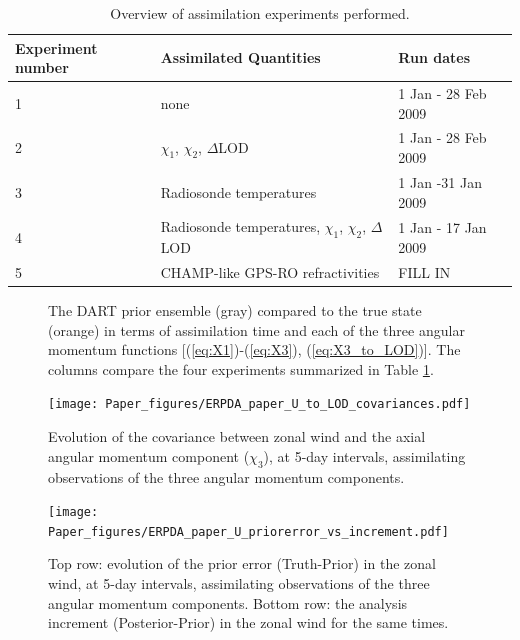 
\begin{table}
\caption{Overview of assimilation experiments performed.}
\centering
\begin{tabular}{p{2cm}p{5cm}p{4cm}}
Experiment number &  Assimilated Quantities  & Run dates \\
\hline
1 &  none	& 1 Jan - 28 Feb 2009 \\
2 &  $\chi_1$, $\chi_2$, $\Delta$LOD		& 1 Jan - 28 Feb 2009 \\
3 &  Radiosonde temperatures	& 1 Jan -31 Jan 2009	\\
4 &  Radiosonde temperatures, $\chi_1$, $\chi_2$, $\Delta$LOD	& 1 Jan - 17 Jan 2009\\
5 & \textcolor{unsure}{CHAMP-like GPS-RO refractivities} & \textcolor{alert}{FILL IN}	\\
\hline
\end{tabular}
\label{tab:expts}
\end{table}

 \begin{figure}
 \caption{  }
 \label{fig:RS}
\end{figure}

 \begin{figure}
 \caption{ The DART prior ensemble (gray) compared to the true state (orange) in terms of assimilation time and each of the three angular momentum functions [(\ref{eq:X1})-(\ref{eq:X3}), (\ref{eq:X3_to_LOD})].  The columns compare the four experiments summarized in Table \ref{tab:expts}.  }
 \label{fig:fit_to_ERPs}
\end{figure}

 \begin{figure}
	 \texttt{[image: Paper\_figures/ERPDA\_paper\_U\_to\_LOD\_covariances.pdf]}
	 \caption{Evolution of the covariance between zonal wind and the axial angular momentum component ($\chi_3$), at 5-day intervals, assimilating observations of the three angular momentum components.}
 \label{fig:covariances}
\end{figure}

 \begin{figure}
	 \texttt{[image: Paper\_figures/ERPDA\_paper\_U\_priorerror\_vs\_increment.pdf]}
	 \caption{Top row: evolution of the prior error (Truth-Prior) in the zonal wind, at 5-day intervals, assimilating observations of the three angular momentum components. Bottom row: the analysis increment (Posterior-Prior) in the zonal wind for the same times.} 
 \label{fig:error_increments}
\end{figure}


